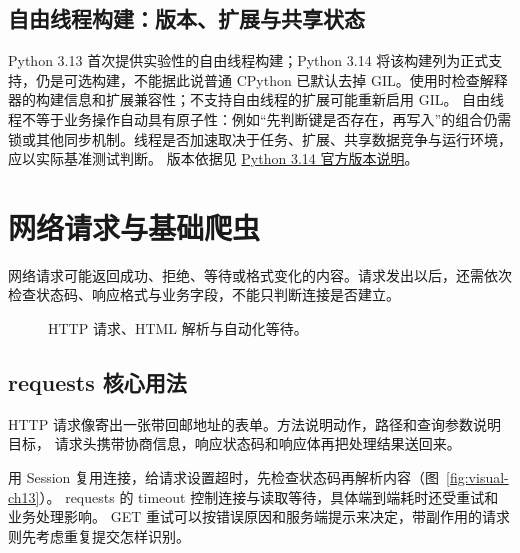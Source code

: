 \documentclass[UTF8,a4paper,oneside,openany,fontset=none,11pt]{ctexbook}
\begin{document}
\section{自由线程构建：版本、扩展与共享状态}
Python 3.13 首次提供实验性的自由线程构建；Python 3.14 将该构建列为正式支持，仍是可选构建，不能据此说普通 CPython 已默认去掉 GIL。使用时检查解释器的构建信息和扩展兼容性；不支持自由线程的扩展可能重新启用 GIL。
自由线程不等于业务操作自动具有原子性：例如“先判断键是否存在，再写入”的组合仍需锁或其他同步机制。线程是否加速取决于任务、扩展、共享数据竞争与运行环境，应以实际基准测试判断。
版本依据见 \href{https://docs.python.org/3.14/whatsnew/3.14.html}{Python 3.14 官方版本说明}。


\chapter{网络请求与基础爬虫}
\label{ch:13-outline}

网络请求可能返回成功、拒绝、等待或格式变化的内容。请求发出以后，还需依次检查状态码、响应格式与业务字段，不能只判断连接是否建立。


\begin{figure}[htbp]
  \centering
  \caption*{HTTP 请求、HTML 解析与自动化等待。}
\end{figure}


\section{requests 核心用法}

HTTP 请求像寄出一张带回邮地址的表单。方法说明动作，路径和查询参数说明目标，
请求头携带协商信息，响应状态码和响应体再把处理结果送回来。

用 Session 复用连接，给请求设置超时，先检查状态码再解析内容（图~\ref{fig:visual-ch13}）。
requests 的 timeout 控制连接与读取等待，具体端到端耗时还受重试和业务处理影响。
GET 重试可以按错误原因和服务端提示来决定，带副作用的请求则先考虑重复提交怎样识别。
\end{document}
